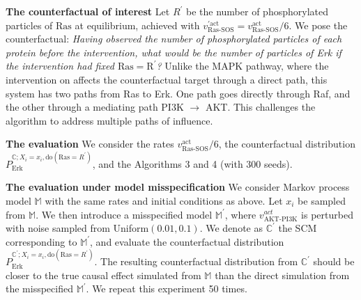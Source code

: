 \documentclass{article}
\begin{document}
{\bf The counterfactual of interest} Let $R^{\prime}$ be the number of phosphorylated particles of $\text{Ras}$ at equilibrium, achieved with $v_{\text{Ras-SOS}}^{\prime \text{act}} = v_{\text{Ras-SOS}}^{\text{act}}/6$. We pose the counterfactual: \emph{Having observed the number of phosphorylated particles of each protein before the intervention, what would be the number of particles of Erk if the intervention had fixed $\text{Ras}=\text{R}^{\prime}$?} Unlike the MAPK pathway, where the  intervention on  affects the counterfactual target  through a direct path, this system has two paths from Ras to Erk. One path goes directly through Raf, and the other through a mediating path PI3K $\rightarrow$ AKT. This challenges the algorithm to address multiple paths of influence.

{\bf The evaluation} We consider the rates $v_{\text{Ras-SOS}}^{\text{act}}/6$, the counterfactual distribution $P_{\text{Erk}}^{\mathbb{C}; X_i = x_i, \text{do}(\text{Ras} = R^{\prime})}$, and the Algorithms 3 and 4 (with 300 seeds).

{\bf The evaluation under model misspecification} We consider Markov process model $\mathbb{M}$ with the same rates and initial conditions as above. Let $x_i$ be sampled from $\mathbb{M}$.
We then introduce a misspecified model $\mathbb{M}^{\prime}$, where $v^{act}_{\text{AKT-PI3K}}$ is perturbed with noise sampled from Uniform$(0.01, 0.1)$.
We denote as $\mathbb{C}^{\prime}$  the SCM corresponding to $\mathbb{M}^{\prime}$, and evaluate the counterfactual distribution $P_{\text{Erk}}^{\mathbb{C^{\prime}}; X_i = x_i, \text{do}(\text{Ras} = R^{\prime})}$.
The resulting counterfactual distribution from $\mathbb{C}^{\prime}$ should be closer to the true causal effect simulated from $\mathbb{M}$ than the direct simulation from the misspecified $\mathbb{M}^{\prime}$. We repeat this experiment 50 times.
\end{document}
